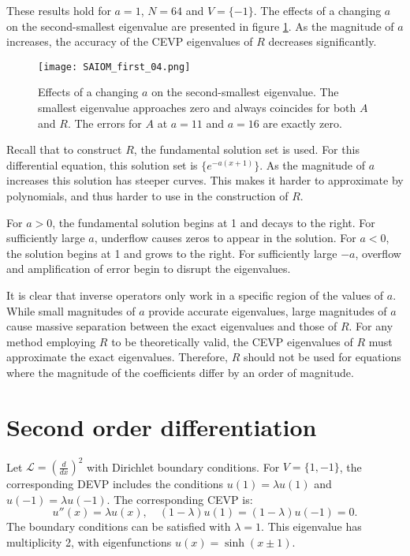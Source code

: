 \documentclass{sfuthesis}
\begin{document}
These results hold for $a = 1$, $N = 64$ and $V = \{ -1 \}$.
The effects of a changing $a$ on the second-smallest eigenvalue are presented in figure \ref{fig:SAIOM 4}.
As the magnitude of $a$ increases, the accuracy of the CEVP eigenvalues of $R$ decreases significantly.

\begin{figure}
\texttt{[image: SAIOM\_first\_04.png]}
\caption{Effects of a changing $a$ on the second-smallest eigenvalue. The smallest eigenvalue approaches zero and always coincides for both $A$ and $R$. The errors for $A$ at $a = 11$ and $a = 16$ are exactly zero.}
\label{fig:SAIOM 4}
\end{figure}

Recall that to construct $R$, the fundamental solution set is used.
For this differential equation, this solution set is $\{ e^{-a(x+1)} \}$.
As the magnitude of $a$ increases this solution has steeper curves.
This makes it harder to approximate by polynomials, and thus harder to use in the construction of $R$.

For $a>0$, the fundamental solution begins at 1 and decays to the right.
For sufficiently large $a$, underflow causes zeros to appear in the solution.
For $a<0$, the solution begins at 1 and grows to the right.
For sufficiently large $-a$, overflow and amplification of error begin to disrupt the eigenvalues.

It is clear that inverse operators only work in a specific region of the values of $a$.
While small magnitudes of $a$ provide accurate eigenvalues, large magnitudes of $a$ cause massive separation between the exact eigenvalues and those of $R$.
For any method employing $R$ to be theoretically valid, the CEVP eigenvalues of $R$ must approximate the exact eigenvalues.
Therefore, $R$ should not be used for equations where the magnitude of the coefficients differ by an order of magnitude.

\section{Second order differentiation}

Let $\mathcal{L} = (\frac{d}{dx})^2$ with Dirichlet boundary conditions.
For $V = \{1, -1\}$, the corresponding DEVP includes the conditions $u(1) = \lambda u(1)$ and $u(-1) = \lambda u(-1)$.
The corresponding CEVP is:
\begin{equation}
u''(x) = \lambda u(x), \quad (1 - \lambda) u(1) = (1 - \lambda) u(-1) = 0 .
\end{equation}
The boundary conditions can be satisfied with $\lambda = 1$.
This eigenvalue has multiplicity 2, with eigenfunctions $u(x) = \sinh(x \pm 1)$.
\end{document}
